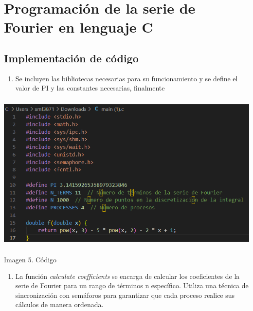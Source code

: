 
\section{Programación de la serie de Fourier en lenguaje C}\label{programaciuxf3n-de-la-serie-de-fourier-en-lenguaje-c}

\subsection{\texorpdfstring{Implementación de código }{Implementación de código }}\label{implementaciuxf3n-de-cuxf3digo}

\begin{enumerate} \def\labelenumi{\arabic{enumi}.} \item   Se incluyen las bibliotecas necesarias para su funcionamiento y se   define el valor de PI y las constantes necesarias, finalmente \end{enumerate}

\includegraphics[width=5.55729in,height=3.12944in]{media/image18.png}

Imagen 5. Código

\begin{enumerate} \def\labelenumi{\arabic{enumi}.} \setcounter{enumi}{1} \item   La función \emph{calculate coefficients} se encarga de calcular los   coeficientes de la serie de Fourier para un rango de términos n   específico. Utiliza una técnica de sincronización con semáforos para   garantizar que cada proceso realice sus cálculos de manera ordenada. \end{enumerate}

